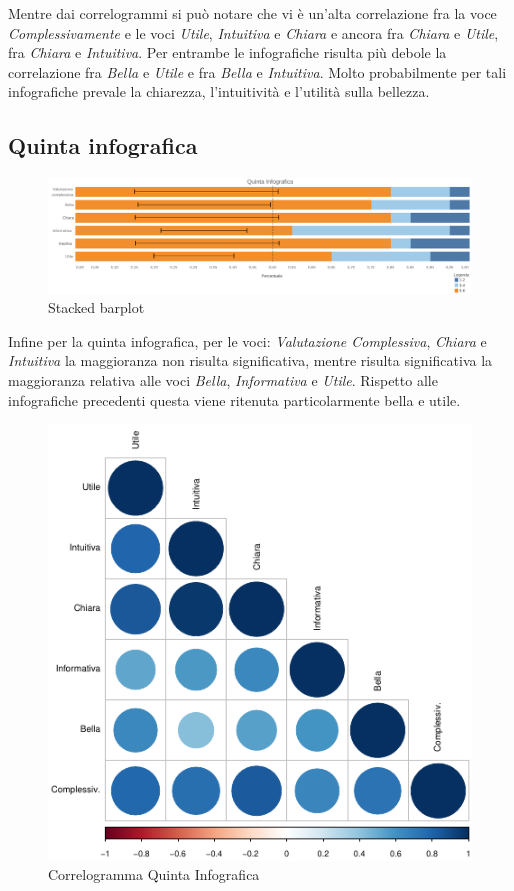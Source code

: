\newpage
Mentre dai correlogrammi si può notare che vi è un'alta correlazione fra la voce \textit{Complessivamente} e le voci \textit{Utile}, \textit{Intuitiva} e \textit{Chiara} e ancora fra \textit{Chiara} e \textit{Utile}, fra \textit{Chiara} e \textit{Intuitiva}. Per entrambe le infografiche risulta più debole la correlazione fra \textit{Bella} e \textit{Utile} e fra \textit{Bella} e \textit{Intuitiva}. Molto probabilmente per tali infografiche prevale la chiarezza, l'intuitività e l'utilità sulla bellezza. 

\subsection{Quinta infografica}

	\begin{figure}[h]
			\centering
			\includegraphics[width=1\linewidth]{imgs/vis5.png}
			\caption{Stacked barplot}
			\label{fig:Terza infografica11}
		\end{figure}
Infine per la quinta infografica, per le voci: \textit{Valutazione Complessiva}, \textit{Chiara} e \textit{Intuitiva} la maggioranza non risulta significativa, mentre risulta significativa la maggioranza relativa alle voci \textit{Bella}, \textit{Informativa} e \textit{Utile}. 	Rispetto alle infografiche precedenti questa viene ritenuta particolarmente bella e utile.  

\newpage

\begin{figure}[h]
			\centering
			\includegraphics[width=0.4\linewidth]{imgs/corrVIS5.png}
			\caption{Correlogramma Quinta Infografica}
			\label{fig:Terza infografica111}
		\end{figure}



